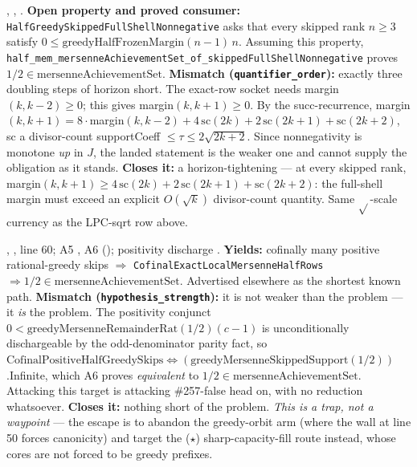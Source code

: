 \begin{obs} 
,
,
.
\textbf{Open property and proved consumer:} \texttt{HalfGreedySkippedFullShellNonnegative} asks
that every skipped rank $n\ge3$ satisfy
$0\le\mathrm{greedyHalfFrozenMargin}(n{-}1)\,n$. Assuming this property,
\texttt{half\_mem\_mersenneAchievementSet\_of\_skippedFullShellNonnegative} proves
$1/2\in\mathrm{mersenneAchievementSet}$.
\textbf{Mismatch (\texttt{quantifier\_order}):} exactly three doubling steps of horizon short.
The exact-row socket needs margin$(k,k{-}2)\ge0$; this gives margin$(k,k{+}1)\ge0$. By the
succ-recurrence, margin$(k,k{+}1)=8\cdot$margin$(k,k{-}2)+4\,\mathrm{sc}(2k)+2\,\mathrm{sc}(2k{+}1)
+\mathrm{sc}(2k{+}2)$, sc a divisor-count supportCoeff $\le\tau\le 2\sqrt{2k+2}$. Since
nonnegativity is monotone \emph{up} in $J$, the landed statement is the weaker one and cannot
supply the obligation as it stands.
\textbf{Closes it:} a horizon-tightening — at every skipped rank, margin$(k,k{+}1) \ge
4\,\mathrm{sc}(2k)+2\,\mathrm{sc}(2k{+}1)+\mathrm{sc}(2k{+}2)$: the full-shell margin must exceed
an explicit $O(\sqrt k)$ divisor-count quantity. Same $\sqrt{}$-scale currency as the LPC-sqrt row
above.
\end{obs}

\begin{obs} 
,
,
line 60; A5
,
A6 (); positivity discharge
.
\textbf{Yields:} cofinally many positive rational-greedy skips $\Rightarrow$
\texttt{CofinalExactLocalMersenneHalfRows} $\Rightarrow 1/2 \in
\mathrm{mersenneAchievementSet}$. Advertised elsewhere as the shortest known path.
\textbf{Mismatch (\texttt{hypothesis\_strength}):} it is not weaker than the problem — it \emph{is}
the problem. The positivity conjunct $0 < \mathrm{greedyMersenneRemainderRat}(1/2)(c{-}1)$ is
unconditionally dischargeable by the odd-denominator parity fact, so
$\mathrm{CofinalPositiveHalfGreedySkips} \Leftrightarrow
(\mathrm{greedyMersenneSkippedSupport}(1/2))$.Infinite, which A6 proves \emph{equivalent} to
$1/2 \in \mathrm{mersenneAchievementSet}$. Attacking this target is attacking \#257-false head on,
with no reduction whatsoever.
\textbf{Closes it:} nothing short of the problem. \emph{This is a trap, not a waypoint} — the
escape is to abandon the greedy-orbit arm (where the wall at line 50 forces canonicity) and
target the ($\star$) sharp-capacity-fill route instead, whose cores are not forced to be greedy
prefixes.
\end{obs}

